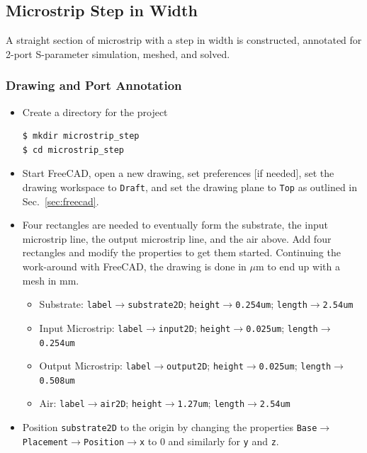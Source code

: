 \documentclass[titlepage]{article}
\renewcommand\_{\textunderscore\linebreak[1]}
\begin{document}
\subsection{Microstrip Step in Width}

A straight section of microstrip with a step in width is constructed, annotated for 2-port S-parameter simulation, meshed, and solved.

\subsubsection{Drawing and Port Annotation}

\begin{itemize}
\item Create a directory for the project
\begin{Verbatim}[fontsize=\small]
$ mkdir microstrip_step
$ cd microstrip_step
\end{Verbatim}
\item Start FreeCAD, open a new drawing, set preferences [if needed], set the drawing workspace to \texttt{Draft}, and set the drawing plane to \texttt{Top} as outlined in Sec.~\ref{sec:freecad}.
\item Four rectangles are needed to eventually form the substrate, the input microstrip line, the output microstrip line, and the air above.  Add four rectangles and modify the properties to get them started.  Continuing the work-around with FreeCAD, the drawing is done in $\mu$m to end up with a mesh in mm.
\begin{itemize}
  \item Substrate: \texttt{label}$\rightarrow$\texttt{substrate2D}; \texttt{height}$\rightarrow$\texttt{0.254um}; \texttt{length}$\rightarrow$\texttt{2.54um}
  \item Input Microstrip: \texttt{label}$\rightarrow$\texttt{input2D}; \texttt{height}$\rightarrow$\texttt{0.025um}; \texttt{length}$\rightarrow$\texttt{0.254um}
  \item Output Microstrip: \texttt{label}$\rightarrow$\texttt{output2D}; \texttt{height}$\rightarrow$\texttt{0.025um}; \texttt{length}$\rightarrow$\texttt{0.508um}
  \item Air: \texttt{label}$\rightarrow$\texttt{air2D}; \texttt{height}$\rightarrow$\texttt{1.27um}; \texttt{length}$\rightarrow$\texttt{2.54um}
\end{itemize}
\item Position \texttt{substrate2D} to the origin by changing the properties \texttt{Base}$\rightarrow$\texttt{Placement}$\rightarrow$\texttt{Position}$\rightarrow$\texttt{x} to 0 and similarly for \texttt{y} and \texttt{z}.

\end{itemize}
\end{document}
